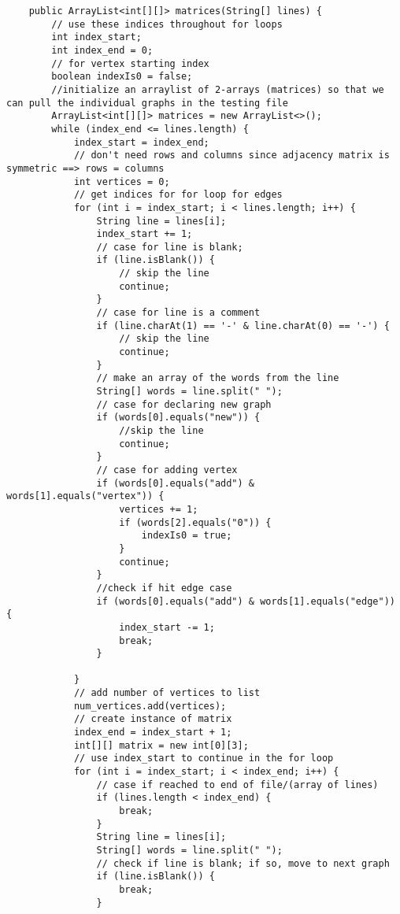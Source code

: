 \documentclass{article}
\begin{document}
\begin{lstlisting}
    public ArrayList<int[][]> matrices(String[] lines) {
        // use these indices throughout for loops
        int index_start;
        int index_end = 0;
        // for vertex starting index
        boolean indexIs0 = false;
        //initialize an arraylist of 2-arrays (matrices) so that we can pull the individual graphs in the testing file
        ArrayList<int[][]> matrices = new ArrayList<>();
        while (index_end <= lines.length) {
            index_start = index_end;
            // don't need rows and columns since adjacency matrix is symmetric ==> rows = columns
            int vertices = 0;
            // get indices for for loop for edges
            for (int i = index_start; i < lines.length; i++) {
                String line = lines[i];
                index_start += 1;
                // case for line is blank;
                if (line.isBlank()) {
                    // skip the line
                    continue;
                }
                // case for line is a comment
                if (line.charAt(1) == '-' & line.charAt(0) == '-') {
                    // skip the line
                    continue;
                }
                // make an array of the words from the line
                String[] words = line.split(" ");
                // case for declaring new graph
                if (words[0].equals("new")) {
                    //skip the line
                    continue;
                }
                // case for adding vertex
                if (words[0].equals("add") & words[1].equals("vertex")) {
                    vertices += 1;
                    if (words[2].equals("0")) {
                        indexIs0 = true;
                    }
                    continue;
                }
                //check if hit edge case
                if (words[0].equals("add") & words[1].equals("edge")) {
                    index_start -= 1;
                    break;
                }

            }
            // add number of vertices to list
            num_vertices.add(vertices);
            // create instance of matrix
            index_end = index_start + 1;
            int[][] matrix = new int[0][3];
            // use index_start to continue in the for loop
            for (int i = index_start; i < index_end; i++) {
                // case if reached to end of file/(array of lines)
                if (lines.length < index_end) {
                    break;
                }
                String line = lines[i];
                String[] words = line.split(" ");
                // check if line is blank; if so, move to next graph
                if (line.isBlank()) {
                    break;
                }


\end{lstlisting}
\end{document}
